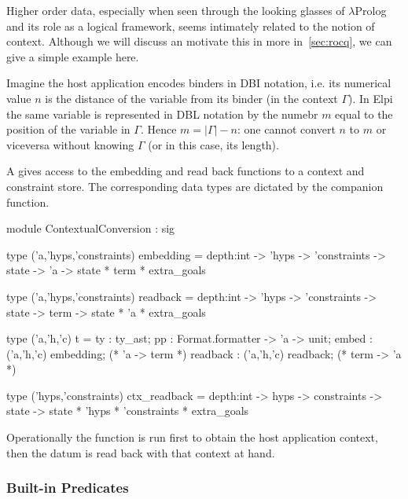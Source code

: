 \documentclass[a4paper, 11pt]{book}
\begin{document}
Higher order data, especially when seen through the looking glasses of
$\lambda$Prolog and its role as a logical framework, seems intimately
related to the notion of context. Although we will discuss an motivate
this in more in~\cref{sec:rocq}, we can give a simple example here.

Imagine the host application encodes binders in DBI notation, i.e.
its numerical value $n$ is the distance of the variable from its
binder (in the context $\Gamma$). In Elpi the same variable is represented in DBL
notation by the numebr $m$ equal to the position of the variable in $\Gamma$.
Hence $m = |\Gamma| - n$: one cannot convert $n$ to $m$ or viceversa
without knowing $\Gamma$ (or in this case, its length).

A  gives access to the embedding and
read back functions to a context and constraint store. The corresponding
data types are dictated by the  companion function.

\begin{ocamlcode}
module ContextualConversion : sig

type ('a,'hyps,'constraints) embedding =
  depth:int -> 'hyps -> 'constraints ->
  state -> 'a -> state * term * extra_goals

type ('a,'hyps,'constraints) readback =
  depth:int -> 'hyps -> 'constraints ->
  state -> term -> state * 'a * extra_goals

type ('a,'h,'c) t = {
  ty : ty_ast;
  pp : Format.formatter -> 'a -> unit;
  embed : ('a,'h,'c) embedding;   (* 'a -> term *)
  readback : ('a,'h,'c) readback; (* term -> 'a *)
}

type ('hyps,'constraints) ctx_readback =
  depth:int -> hyps -> constraints ->
  state -> state * 'hyps * 'constraints * extra_goals
\end{ocamlcode}

\noindent
Operationally the  function is run first to
obtain the host application context, then the datum is read back
with that context at hand.

\subsubsection{Built-in Predicates}\label{sec:builtins}
\end{document}
